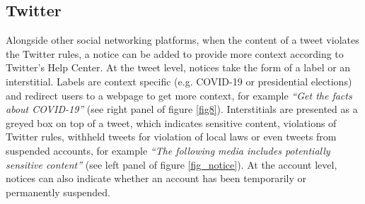 \documentclass{article}
\begin{document}
\subsection{Twitter}

Alongside other social networking platforms, when the content of a tweet violates the Twitter rules, a notice can be added to provide more context according to Twitter's Help Center. At the tweet level, notices take the form of a label or an interstitial. Labels are context specific (e.g. COVID-19 or presidential elections) and  redirect users to a webpage to get more context, for example {\it ``Get the facts about COVID-19''} (see right panel of figure \ref{fig8}). Interstitials are presented as a greyed box on top of a tweet, which indicates sensitive content, violations of Twitter rules, withheld tweets for violation of local laws or even tweets from suspended accounts, for example {\it ``The following media includes potentially sensitive content''} (see left panel of figure \ref{fig_notice}). At the account level, notices can also indicate whether an account has been temporarily or permanently suspended. 

\end{document}
